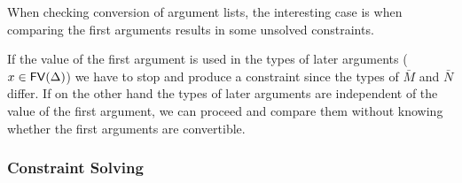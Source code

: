 When checking conversion of argument lists, the interesting case is when
comparing the first arguments results in some unsolved constraints.


If the value of the first argument is used in the types of later arguments ($x
\in \mathsf{FV}({\Delta})$) we have to stop and produce a constraint since the types of
$\bar M$ and $\bar N$ differ. If on the other hand the types of later arguments
are independent of the value of the first argument, we can proceed and compare
them without knowing whether the first arguments are convertible.


\subsubsection{Constraint Solving}

